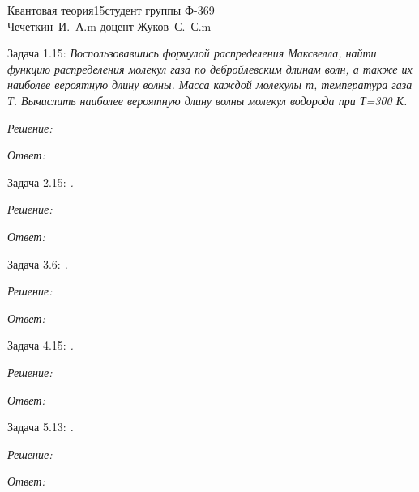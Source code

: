 




\renewcommand{\labelenumi}{\asbuk{enumi})}
\newcommand{\mr}[1]{\mathrm{#1}}


{Квантовая теория}{}{15}{студент группы Ф-369\\Чечеткин~И.~А.}{m}
{доцент Жуков~С.~С.}{m}
\newpage

Задача 1.15: \emph{Воспользовавшись формулой распределения Максвелла, найти 
функцию распределения молекул газа по дебройлевским длинам волн, 
а также их наиболее вероятную длину волны. Масса каждой молекулы 
т, температура газа Т. Вычислить наиболее вероятную длину волны 
молекул водорода при Т=300 К. }

\vspace*{2em}
\emph{Решение:}

\vspace*{2em}        
\emph{Ответ:}

\newpage

Задача 2.15: \emph{.}

\vspace*{2em}
\emph{Решение:}

\vspace*{2em}
\emph{Ответ:}

\newpage

Задача 3.6: \emph{.}

\vspace*{2em}
\emph{Решение:}

\vspace*{2em}
\emph{Ответ:}

\newpage

Задача 4.15: \emph{.}

\vspace*{2em}
\emph{Решение:}

\vspace*{2em}
\emph{Ответ:}

\newpage

Задача 5.13: \emph{.}

\vspace*{2em}
\emph{Решение:}

\vspace*{2em}
\emph{Ответ:}


